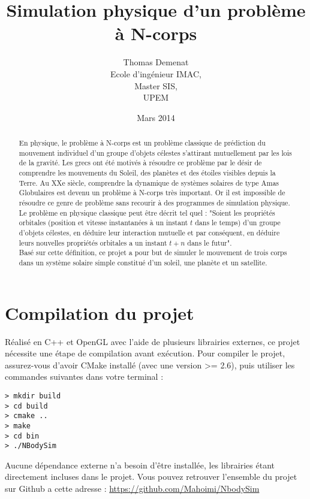 \documentclass{article}
\begin{document}
\title{Simulation physique d'un problème à N-corps }
\author{Thomas Demenat\\
  Ecole d'ingénieur IMAC,\\
  Master SIS,\\
  UPEM}
  \date{Mars 2014}
\maketitle

\begin{abstract}
En physique, le problème à N-corps est un problème classique de prédiction du mouvement individuel d'un groupe d'objets célestes s'attirant mutuellement par les lois de la gravité. Les grecs ont été motivés à résoudre ce problème par le désir de comprendre les mouvements du Soleil, des planètes et des étoiles visibles depuis la Terre. Au XXe siècle, comprendre la dynamique de systèmes solaires de type Amas Globulaires est devenu un problème à N-corps très important. Or il est impossible de résoudre ce genre de problème sans recourir à des programmes de simulation physique.\\ 
Le problème en physique classique peut être décrit tel quel : "Soient les propriétés orbitales (position et vitesse instantanées à un instant $t$ dans le temps) d'un groupe d'objets célestes, en déduire leur interaction mutuelle et par conséquent, en déduire leurs nouvelles propriétés orbitales a un instant $t+n$ dans le futur".\\
Basé sur cette définition, ce projet a pour but de simuler le mouvement de trois corps dans un système solaire simple constitué d'un soleil, une planète et un satellite.
\end{abstract}

\section*{Compilation du projet}
Réalisé en C++ et OpenGL avec l'aide de plusieurs librairies externes, ce projet nécessite une étape de compilation avant exécution.
Pour compiler le projet, assurez-vous d'avoir CMake installé (avec une version >= 2.6), puis utiliser les commandes suivantes dans votre terminal :

\begin{verbatim}
> mkdir build
> cd build
> cmake ..
> make
> cd bin
> ./NBodySim
\end{verbatim}

Aucune dépendance externe n'a besoin d'être installée, les librairies étant directement incluses dans le projet.
Vous pouvez retrouver l'ensemble du projet sur Github a cette adresse : \url{https://github.com/Mahoimi/NbodySim}
\end{document}
